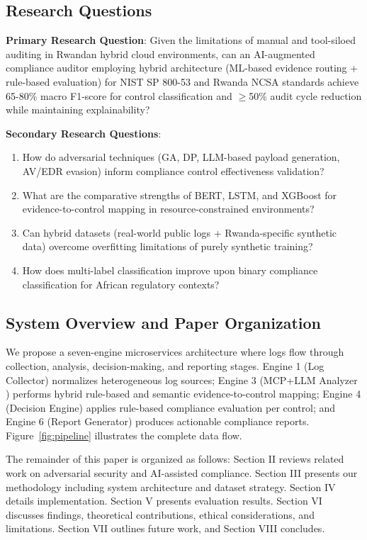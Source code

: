 \documentclass[11pt,conference]{IEEEtran}
\begin{document}
\subsection{Research Questions}

\textbf{Primary Research Question}: Given the limitations of manual and tool-siloed auditing in Rwandan hybrid cloud environments, can an AI-augmented compliance auditor employing hybrid architecture (ML-based evidence routing + rule-based evaluation) for NIST SP 800-53 and Rwanda NCSA standards achieve 65-80\% macro F1-score for control classification and $\geq$50\% audit cycle reduction while maintaining explainability?

\textbf{Secondary Research Questions}:
\begin{enumerate}
    \item How do adversarial techniques (GA, DP, LLM-based payload generation, AV/EDR evasion) inform compliance control effectiveness validation?
    \item What are the comparative strengths of BERT, LSTM, and XGBoost for evidence-to-control mapping in resource-constrained environments?
    \item Can hybrid datasets (real-world public logs + Rwanda-specific synthetic data) overcome overfitting limitations of purely synthetic training?
    \item How does multi-label classification improve upon binary compliance classification for African regulatory contexts?
\end{enumerate}

\subsection{System Overview and Paper Organization}

We propose a seven-engine microservices architecture where logs flow through collection, analysis, decision-making, and reporting stages. Engine 1 (Log Collector) normalizes heterogeneous log sources; Engine 3 (MCP+LLM Analyzer \cite{mcp_anthropic}) performs hybrid rule-based and semantic evidence-to-control mapping; Engine 4 (Decision Engine) applies rule-based compliance evaluation per control; and Engine 6 (Report Generator) produces actionable compliance reports. Figure~\ref{fig:pipeline} illustrates the complete data flow.

The remainder of this paper is organized as follows: Section II reviews related work on adversarial security and AI-assisted compliance. Section III presents our methodology including system architecture and dataset strategy. Section IV details implementation. Section V presents evaluation results. Section VI discusses findings, theoretical contributions, ethical considerations, and limitations. Section VII outlines future work, and Section VIII concludes.
\end{document}
